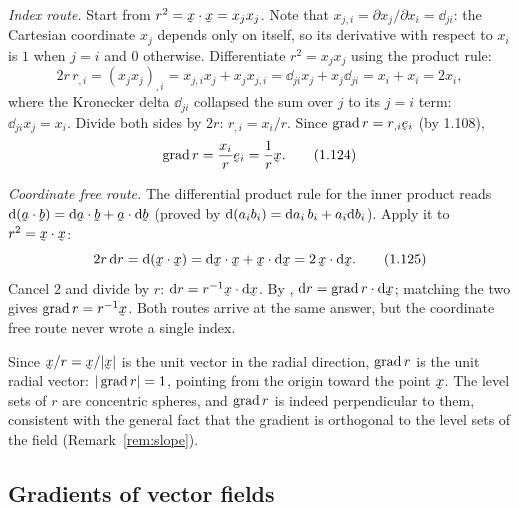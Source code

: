 \begin{example}[gradient of the radius $r=|\bx|$]\label{ex:gradr}
\emph{Index route.} Start from $r^2=\ip\bx\bx=x_jx_j$. Note that
$x_{j,i}=\partial x_j/\partial x_i=\dd_{ji}$: the Cartesian coordinate
$x_j$ depends only on itself, so its derivative with respect to $x_i$ is
$1$ when $j=i$ and $0$ otherwise. Differentiate $r^2=x_jx_j$ using the
product rule:
\begin{equation}
2r\,r_{,i}=(x_jx_j)_{,i}=x_{j,i}x_j+x_jx_{j,i}
=\dd_{ji}x_j+x_j\dd_{ji}=x_i+x_i=2x_i, \tag{1.123}\label{eq:1.123}
\end{equation}
where the Kronecker delta $\dd_{ji}$ collapsed the sum over $j$ to its
$j=i$ term: $\dd_{ji}x_j=x_i$. Divide both sides by $2r$:
$r_{,i}=x_i/r$. Since $\grad r=r_{,i}\be_i$ (by 1.108),
\begin{equation}
\grad r=\frac{x_i}{r}\be_i=\frac{1}{r}\bx. \tag{1.124}\label{eq:1.124}
\end{equation}

\emph{Coordinate free route.} The differential product rule for the
inner product reads $\dl(\ip\ba\bb)=\ip{\dl\ba}\bb+\ip\ba{\dl\bb}$
(proved by $\mathrm{d}(a_ib_i)=\mathrm{d} a_i\,b_i+a_i\mathrm{d} b_i$). Apply it to
$r^2=\ip\bx\bx$:
\begin{equation}
2r\,\dl r=\dl(\ip\bx\bx)=\ip{\dl\bx}\bx+\ip\bx{\dl\bx}=2\,\ip\bx{\dl\bx}.
\tag{1.125}\label{eq:1.125}
\end{equation}
Cancel $2$ and divide by $r$: $\dl r=r^{-1}\ip\bx{\dl\bx}$. By ,
$\dl r=\grad r\cdot\dl\bx$; matching the two gives $\grad r=r^{-1}\bx$.
Both routes arrive at the same answer, but the coordinate free route
never wrote a single index.
\end{example}

\begin{remark}\label{rem:gradr}
Since $\bx/r=\bx/|\bx|$ is the unit vector in the radial direction,
$\operatorname{grad} r$ is the unit radial vector: $|\operatorname{grad} r|=1$, pointing from the
origin toward the point $\bx$. The level sets of $r$ are concentric
spheres, and $\operatorname{grad} r$ is indeed perpendicular to them, consistent with
the general fact that the gradient is orthogonal to the level sets of
the field (Remark~\ref{rem:slope}).
\end{remark}

\subsection{Gradients of vector fields}\label{ss:gradv}

